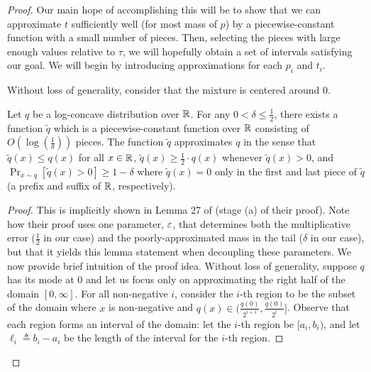 \begin{proof}
    Our main hope of accomplishing this will be to show that we can approximate $t$ sufficiently well (for most mass of $p$) by a piecewise-constant function with a small number of pieces.
    Then, selecting the pieces with large enough values relative to $\tau$, we will hopefully obtain a set of intervals satisfying our goal. 
    We will begin by introducing approximations for each $p_i$ and $t_i$.

    Without loss of generality, consider that the mixture is centered around $0$.

    \begin{lemma}\label{lemma:p-decomp}
        
        Let $q$ be a log-concave distribution over $\mathbb{R}$.
        For any $0<\delta \le \frac{1}{2}$, there exists a function $\tilde{q}$ which is a piecewise-constant function over $\mathbb{R}$ consisting of $O(\log(\frac{1}{\delta}))$ pieces.
        The function $\tilde{q}$ approximates $q$ in the sense that $\tilde{q}(x) \le q(x)$ for all $x \in \mathbb{R}$, $\tilde{q}(x) \ge \frac{1}{2} \cdot q(x)$ whenever $\tilde{q}(x) > 0$, and $\Pr_{x \sim q}[\tilde{q}(x)>0] \ge 1 -\delta$ where $\tilde{q}(x)=0$ only in the first and last piece of $\tilde{q}$ (a prefix and suffix of $\mathbb{R}$, respectively).

    \end{lemma}


    \begin{proof}
        This is implicitly shown in Lemma 27 of \cite{chan2014efficient} (stage (a) of their proof). Note how their proof uses one parameter, $\varepsilon$, that determines both the multiplicative error ($\frac{1}{2}$ in our case) and the poorly-approximated mass in the tail ($\delta$ in our case), but that it yields this lemma statement when decoupling these parameters. We now provide brief intuition of the proof idea. Without loss of generality, suppose $q$ has its mode at $0$ and let us focus only on approximating the right half of the domain $[0,\infty]$. For all non-negative $i$, consider the $i$-th region to be the subset of the domain where $x$ is non-negative and $q(x) \in (\frac{q(0)}{2^{i+1}},\frac{q(0)}{2^i}]$. Observe that each region forms an interval of the domain: let the $i$-th region be $[a_i,b_i)$, and let $\ell_i \triangleq b_i-a_i$ be the length of the interval for the $i$-th region. 
        

\end{proof}
\end{proof}

